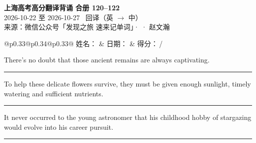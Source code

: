 \documentclass[11pt,a4paper]{article}
\newcommand{\num}[1]{\makebox[1.9em][r]{#1.}\hspace{0.3em}}
\newcommand{\wline}{\noindent\rule{\linewidth}{0.4pt}}
\begin{document}
\pagestyle{plain}
\begin{center}
{\LARGE\bfseries 上海高考高分翻译背诵 \quad 合册 120–122}\\[0.25em]
{\large 2026-10-22 至 2026-10-27 \quad\ 回译（英 $\to$ 中）}\\[0.35em]
{\footnotesize 来源：微信公众号「发现之旅 速来记单词」·  · 赵文瀚}
\end{center}

\vspace{0.4em}
\noindent\begin{tabular}{@{}p{0.33\textwidth}@{}p{0.34\textwidth}@{}p{0.33\textwidth}@{}}
姓名：\underline{\hspace{2.0cm}} & 日期：\underline{\hspace{2.0cm}} & 得分：\underline{\hspace{1.4cm}}\,/ \\
\end{tabular}

\vspace{0.5em}

\vspace{0.8em}
\vspace{0.35em}\vspace{0.15em}

\begin{minipage}{\linewidth}

\num{1}There’s no doubt that those ancient remains are always captivating.

\vspace{0.25em}

\wline

\end{minipage}

\begin{minipage}{\linewidth}

\num{2}To help these delicate flowers survive, they must be given enough sunlight, timely watering and sufficient nutrients.

\vspace{0.25em}

\wline

\end{minipage}

\begin{minipage}{\linewidth}

\num{3}It never occurred to the young astronomer that his childhood hobby of stargazing would evolve into his career pursuit.

\vspace{0.25em}

\wline

\end{minipage}
\end{document}
